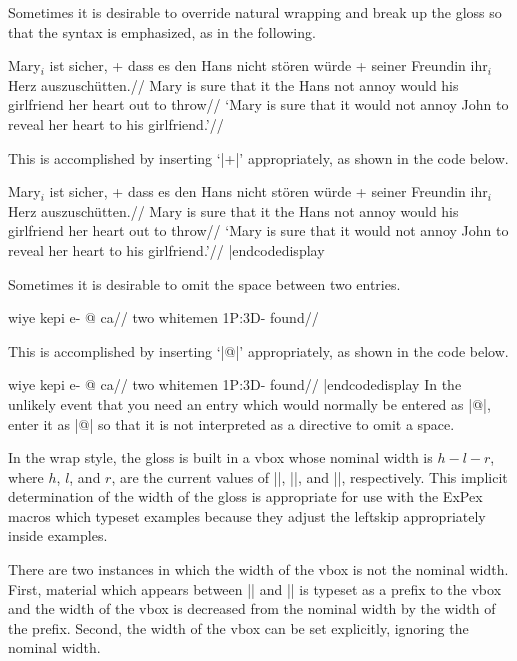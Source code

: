 Sometimes it is desirable to override natural wrapping and
break up the gloss so that the syntax is emphasized, as in the
following.

\framedisplay
\ex
\begingl
\gla Mary$_i$ ist sicher, + dass es den Hans nicht st\"oren w\"urde
+ seiner Freundin ihr$_i$ Herz auszusch\"utten.//
\glb Mary is sure that it the Hans not annoy would
his girlfriend her heart {out to
throw}//
\glft  `Mary is sure that it would not annoy John to reveal her
heart to his girlfriend.'//
\endgl
\xe
\endframedisplay

\bigskip
This is accomplished by inserting `|+|'
appropriately, as shown in the code below.

\codedisplay
\ex
\begingl
\gla Mary$_i$ ist sicher, + dass es den Hans nicht st\"oren w\"urde
+ seiner Freundin ihr$_i$ Herz auszusch\"utten.//
\glb Mary is sure that it the Hans not annoy would
his girlfriend her heart {out to
throw}//
\glft  `Mary is sure that it would not annoy John to reveal her
heart to his girlfriend.'//
\endgl
\xe
|endcodedisplay

Sometimes it is desirable to omit the space between two entries.

\framedisplay
\ex
\begingl
\gla wiye kepi e- @ ca//
\glb two whitemen \sc1P:3D- found//
\endgl
\xe
\endframedisplay

This is accomplished by inserting `|@|' appropriately, as shown
in the code below.

\codedisplay
\ex
\begingl
\gla wiye kepi e- @ ca//
\glb two whitemen \sc1P:3D- found//
\endgl
\xe
|endcodedisplay
In the unlikely event that you need an entry which
would normally be entered as |@|, enter it as |{{@}}|
so that it is not interpreted as a directive to omit a space.

In the wrap style, the gloss is built in a vbox whose nominal
width is $h-l-r$, where $h$, $l$, and $r$, are the current values
of |\hsize|, |\leftskip|, and |\rightskip|,
respectively.  This implicit determination of the width of the
gloss is appropriate for use with the ExPex macros which typeset
examples because they adjust the leftskip appropriately inside
examples.

There are two instances in which the width of the vbox is not the
nominal width.  First, material which appears between
|\begingl| and |\gla| is typeset as a prefix to the
vbox and the width of the vbox is decreased from the nominal
width by the width of the prefix.  Second, the width of the vbox
can be set explicitly, ignoring the nominal width.

